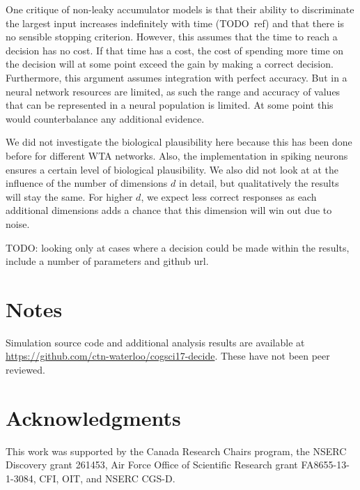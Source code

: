 \documentclass[10pt,letterpaper]{article}
\begin{document}
One critique of non-leaky accumulator models is that their ability to 
discriminate the largest input increases indefinitely with time (TODO~ref) and 
that there is no sensible stopping criterion. However, this assumes that the 
time to reach a decision has no cost. If that time has a cost, the cost of 
spending more time on the decision will at some point exceed the gain by making 
a correct decision. Furthermore, this argument assumes integration with perfect 
accuracy. But in a neural network resources are limited, as such the range and 
accuracy of values that can be represented in a neural population is limited.  
At some point this would counterbalance any additional evidence.

We did not investigate the biological plausibility here because this has been 
done before for different WTA networks.  Also, the implementation in spiking 
neurons ensures a certain level of biological plausibility. We also did not look 
at at the influence of the number of dimensions $d$ in detail, but qualitatively 
the results will stay the same. For higher $d$, we expect less correct responses 
as each additional dimensions adds a chance that this dimension will win out due 
to noise.

TODO\@: looking only at cases where a decision could be made within the results, 
include a number of parameters and github url.

\section{Notes}
Simulation source code and additional analysis results are available at 
\url{https://github.com/ctn-waterloo/cogsci17-decide}.  These have not been peer 
reviewed.

\section{Acknowledgments}
This work was supported by the Canada Research Chairs program,
the NSERC Discovery grant 261453, Air Force Office of Scientific Research grant 
FA8655-13-1-3084, CFI, OIT, and NSERC CGS-D\@.  %



\setlength{\bibleftmargin}{.125in}
\setlength{\bibindent}{-\bibleftmargin}


\end{document}
